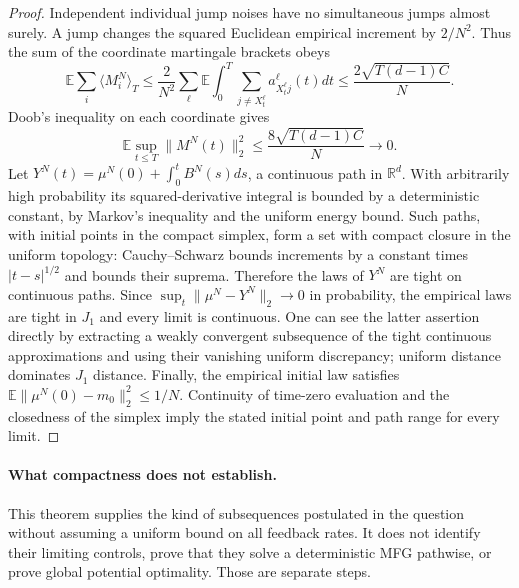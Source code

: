 \documentclass[11pt,a4paper]{article}
\theoremstyle{definition}
\theoremstyle{remark}
\begin{document}
\begin{proof}
Independent individual jump noises have no simultaneous jumps almost surely. A jump changes the squared Euclidean empirical increment by $2/N^2$. Thus the sum of the coordinate martingale brackets obeys
\[
 \mathbb E\sum_i\langle M_i^N\rangle_T
 \leq\frac2{N^2}\sum_\ell\mathbb E\int_0^T
              \sum_{j\ne X_t^\ell}a_{X_t^\ell j}^\ell(t)dt
 \leq\frac{2\sqrt{T(d-1)C}}N.
\]
Doob's inequality on each coordinate gives
\[
 \mathbb E\sup_{t\leq T}\|M^N(t)\|_2^2
 \leq\frac{8\sqrt{T(d-1)C}}N\longrightarrow0.
\]
Let $Y^N(t)=\mu^N(0)+\int_0^tB^N(s)ds$, a continuous path in $\mathbb R^d$. With arbitrarily high probability its squared-derivative integral is bounded by a deterministic constant, by Markov's inequality and the uniform energy bound. Such paths, with initial points in the compact simplex, form a set with compact closure in the uniform topology: Cauchy--Schwarz bounds increments by a constant times $|t-s|^{1/2}$ and bounds their suprema. Therefore the laws of $Y^N$ are tight on continuous paths. Since $\sup_t\|\mu^N-Y^N\|_2\to0$ in probability, the empirical laws are tight in $J_1$ and every limit is continuous. One can see the latter assertion directly by extracting a weakly convergent subsequence of the tight continuous approximations and using their vanishing uniform discrepancy; uniform distance dominates $J_1$ distance. Finally, the empirical initial law satisfies $\mathbb E\|\mu^N(0)-m_0\|_2^2\leq1/N$. Continuity of time-zero evaluation and the closedness of the simplex imply the stated initial point and path range for every limit.
\end{proof}

\paragraph{What compactness does not establish.}
This theorem supplies the kind of subsequences postulated in the question without assuming a uniform bound on all feedback rates. It does not identify their limiting controls, prove that they solve a deterministic MFG pathwise, or prove global potential optimality. Those are separate steps.
\end{document}
